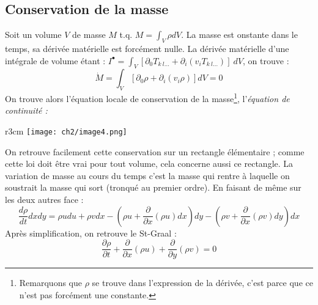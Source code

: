     \subsection{Conservation de la masse} 
    Soit un volume $V$ de masse $M$ t.q. $M = \int_V \rho dV$. La masse est onstante dans le temps, sa 
    dérivée matérielle est forcément nulle. La dérivée matérielle d'une intégrale de volume étant : $I^
    \bullet = \int_V [\partial_0T_{k\ l\dots} + \partial_i(v_iT_{k\ l\dots})]\ dV$, on trouve :
    \begin{equation}
    \dot{M} = \int_V [\partial_0\rho + \partial_i(v_i\rho)]dV = 0
    \end{equation}
    On trouve alors l'équation locale de conservation de la masse\footnote{Remarquons que $\rho$ se trouve
    dans l'expression de la dérivée, c'est parce que ce n'est pas forcément une constante.}, l'\textit{équation 
    de continuité :}
    \ \\
    \begin{wrapfigure}[8]{r}{3cm}
    \texttt{[image: ch2/image4.png]}
    \end{wrapfigure}
    On retrouve facilement cette conservation sur un rectangle élémentaire ; comme cette loi doit être vrai
    pour tout volume, cela concerne aussi ce rectangle. La variation de masse au cours du temps c'est la masse qui
    rentre à laquelle on soustrait la masse qui sort (tronqué au premier ordre). En faisant de même sur les
    deux autres face :
    \begin{equation}
    \frac{d\rho}{dt}dxdy = \rho u du + \rho v dx - \left( \rho u + \frac{\partial}{\partial x}(\rho u)dx\right)
    dy - \left( \rho v + \frac{\partial}{\partial x}(\rho v)dy\right)dx
    \end{equation}
    Après simplification, on retrouve le St-Graal :
    \begin{equation}
    \frac{\partial \rho}{\partial t} + \frac{\partial}{\partial x}(\rho u) + \frac{\partial}{\partial y}(\rho v) = 0
    \end{equation}
    
